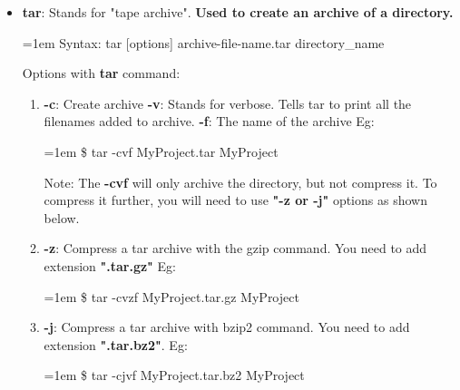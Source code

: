 \begin{flushleft}
\begin{itemize}
		\item \textbf{tar}: Stands for "tape archive". \textbf{Used to create an archive of a directory.}
		\begin{tcolorbox}[breakable,notitle,boxrule=0pt,colback=pink,colframe=pink]
			\color{black}
			\font=1em
			Syntax: tar [options] archive-file-name.tar directory\_name
			\font=4pt
		\end{tcolorbox}
		Options with \textbf{tar} command:
		\begin{enumerate}
			\item \textbf{-c}: Create archive
			\newline
			\textbf{-v}: Stands for verbose. Tells tar to print all the filenames added to archive.
			\newline
			\textbf{-f}: The name of the archive
			Eg:
			\begin{tcolorbox}[breakable,notitle,boxrule=-0pt,colback=black,colframe=black]
				\color{green}
				\font=1em
				\$ tar -cvf MyProject.tar  MyProject
				\font=4pt
			\end{tcolorbox}		
			\begin{tcolorbox}[breakable,notitle,boxrule=0pt,colback=yellow,colframe=yellow]
				\color{black}
				Note: The \textbf{-cvf} will only archive the directory, but not compress it. To compress it further, you will need to use \textbf{"-z or -j"} options as shown below.
			\end{tcolorbox}
			
			\bigskip
			\bigskip
			\item \textbf{-z}: Compress a tar archive with the gzip command. You need to add extension \textbf{".tar.gz"}
			\newline
			Eg:
			\begin{tcolorbox}[breakable,notitle,boxrule=-0pt,colback=black,colframe=black]
				\color{green}
				\font=1em
				\$ tar -cvzf MyProject.tar.gz  MyProject
				\font=4pt
			\end{tcolorbox}		
		
			\bigskip
			\bigskip
			\item \textbf{-j}: Compress a tar archive with bzip2 command. You need to add extension \textbf{".tar.bz2"}.
			\newline
			Eg:
			\begin{tcolorbox}[breakable,notitle,boxrule=-0pt,colback=black,colframe=black]
				\color{green}
				\font=1em
				\$ tar -cjvf MyProject.tar.bz2  MyProject
				\font=4pt
			\end{tcolorbox}		
		

\end{enumerate}
\end{itemize}
\end{flushleft}
